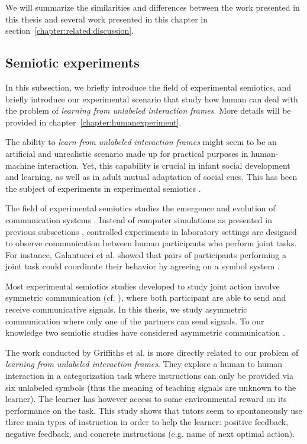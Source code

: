 We will summarize the similarities and differences between the work presented in this thesis and several work presented in this chapter in section~\ref{chapter:related:discussion}.

\subsection{Semiotic experiments} 

In this subsection, we briefly introduce the field of experimental semiotics, and briefly introduce our experimental scenario that study how human can deal with the problem of \emph{learning from unlabeled interaction frames}. More details will be provided in chapter~\ref{chapter:humanexperiment}.

The ability to \emph{learn from unlabeled interaction frames} might seem to be an artificial and unrealistic scenario made up for practical purposes in human-machine interaction. Yet, this capability is crucial in infant social development and learning, as well as in adult mutual adaptation of social cues. This has been the subject of experiments in experimental semiotics \cite{galantucci2009experimental}. 

The field of experimental semiotics studies the emergence and evolution of communication systems \cite{galantucci2009experimental}. Instead of computer simulations as presented in previous subsections \cite{cangelosi2002simulating,steels2012experiments}, controlled experiments in laboratory settings are designed to observe communication between human participants who perform joint tasks. For instance, Galantucci et al. showed that pairs of participants performing a joint task could coordinate their behavior by agreeing on a symbol system \cite{galantucci2005experimental}.

Most experimental semiotics studies developed to study joint action involve symmetric communication (cf. \cite{Galantucci2011experimental}), where both participant are able to send and receive communicative signals. In this thesis, we study asymmetric communication where only one of the partners can send signals. To our knowledge two semiotic studies have considered asymmetric communication \cite{de2010exploring,griffiths2012bottom}. 

The work conducted by Griffiths et al. \cite{griffiths2012bottom} is more directly related to our problem of \emph{learning from unlabeled interaction frames}. They explore a human to human interaction in a categorization task where instructions can only be provided via six unlabeled symbols (thus the meaning of teaching signals are unknown to the learner). The learner has however access to some environmental reward on its performance on the task. This study shows that tutors seem to spontaneously use three main types of instruction in order to help the learner: positive feedback, negative feedback, and concrete instructions (e.g. name of next optimal action).

